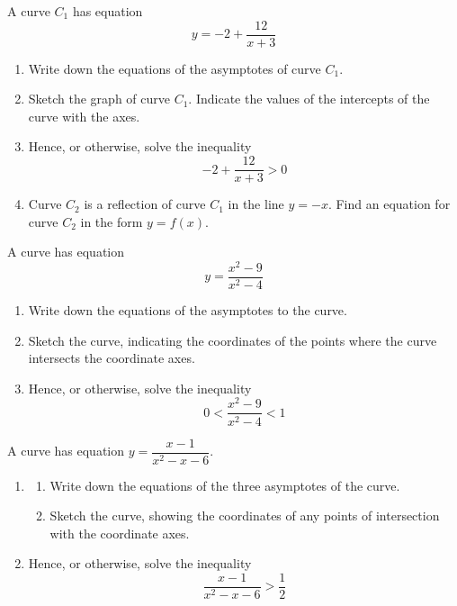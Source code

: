 \documentclass[leqno]{article}
\begin{document}
\begin{enumerate}[
  label=\textbf{\arabic*.},
  leftmargin=*,
  topsep=0pt,
  partopsep=0pt,
  parsep=0pt
]
\newpage

\questionitem

A curve $C_1$ has equation
\[
y=-2+\frac{12}{x+3}
\]

\begin{enumerate}[label=\textbf{(\alph*)}]
  \item Write down the equations of the asymptotes of curve $C_1$.  \\
  \item Sketch the graph of curve $C_1$. 
  Indicate the values of the intercepts of the curve with the axes. 
  \item Hence, or otherwise, solve the inequality
  \[
  -2+\frac{12}{x+3}>0
  \]
  \item Curve $C_2$ is a reflection of curve $C_1$ in the line $y=-x$.
  Find an equation for curve $C_2$ in the form $y=f(x)$. 
\end{enumerate}

\newpage

\questionitem

A curve has equation
\[
y = \frac{x^2 - 9}{x^2 - 4}
\]
\begin{enumerate}[label=\textbf{(\alph*)}]
  \item Write down the equations of the asymptotes to the curve.  \\
  \item Sketch the curve, indicating the coordinates of the points where the curve intersects the coordinate axes.  \\
  \item Hence, or otherwise, solve the inequality
  \[
  0 < \frac{x^2 - 9}{x^2 - 4} < 1
  \]
\end{enumerate}

\newpage

\questionitem

A curve has equation $y=\dfrac{x-1}{x^2-x-6}$. \\
\begin{enumerate}[label=\textbf{(\alph*)}]
  \item
  \begin{enumerate}[label=(\roman*)]
    \item Write down the equations of the three asymptotes of the curve. 
    \item Sketch the curve, showing the coordinates of any points of intersection with the coordinate axes.  \\
  \end{enumerate}
  \item Hence, or otherwise, solve the inequality
  \[
  \frac{x-1}{x^2-x-6}>\frac{1}{2}
  \]
\end{enumerate}


\end{enumerate}
\end{document}
